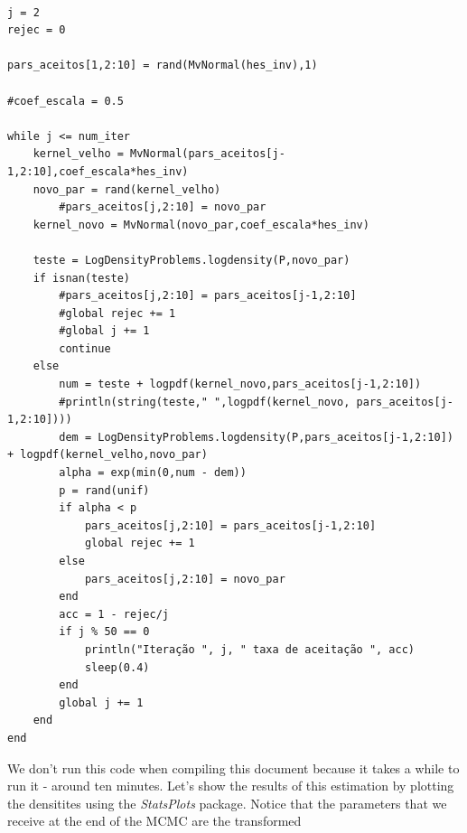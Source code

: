 \documentclass[12pt,a4paper]{article}
\begin{document}
\begin{verbatim}

j = 2
rejec = 0

pars_aceitos[1,2:10] = rand(MvNormal(hes_inv),1)

#coef_escala = 0.5

while j <= num_iter
    kernel_velho = MvNormal(pars_aceitos[j-1,2:10],coef_escala*hes_inv)
    novo_par = rand(kernel_velho)
        #pars_aceitos[j,2:10] = novo_par
    kernel_novo = MvNormal(novo_par,coef_escala*hes_inv)

    teste = LogDensityProblems.logdensity(P,novo_par)
    if isnan(teste)
        #pars_aceitos[j,2:10] = pars_aceitos[j-1,2:10]
        #global rejec += 1
        #global j += 1
        continue
    else
        num = teste + logpdf(kernel_novo,pars_aceitos[j-1,2:10])
        #println(string(teste," ",logpdf(kernel_novo, pars_aceitos[j-1,2:10])))
        dem = LogDensityProblems.logdensity(P,pars_aceitos[j-1,2:10]) + logpdf(kernel_velho,novo_par)
        alpha = exp(min(0,num - dem))
        p = rand(unif)
        if alpha < p
            pars_aceitos[j,2:10] = pars_aceitos[j-1,2:10]
            global rejec += 1
        else
            pars_aceitos[j,2:10] = novo_par
        end
        acc = 1 - rejec/j
        if j % 50 == 0
            println("Iteração ", j, " taxa de aceitação ", acc)
            sleep(0.4)
        end
        global j += 1
    end
end

\end{verbatim}
We don't run this code when compiling this document because it takes a while to run it - around ten minutes. Let's show the results of this estimation by plotting the densitites using the \emph{StatsPlots} package. Notice that the parameters that we receive at the end of the MCMC are the transformed
\end{document}
